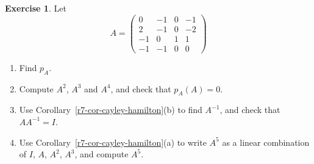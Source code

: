 \documentclass[12pt]{article}
\theoremstyle{definition}
\newtheorem{exercise}{Exercise}
\begin{document}
\begin{exercise}\label{r7-dr-cayley-hamilton}
Let
\[
A=\begin{pmatrix}0&-1&0&-1\\2&-1&0&-2\\-1&0&1&1\\-1&-1&0&0\end{pmatrix}
\]
\begin{enumerate}
\item Find \(p_A\).
\item Compute \(A^2\), \(A^3\) and \(A^4\), and check that \(p_A(A)=0\).
\item Use Corollary~\ref{r7-cor-cayley-hamilton}(b) to find \(A^{-1}\), and check that \(AA^{-1}=I\).
\item Use Corollary~\ref{r7-cor-cayley-hamilton}(a) to write \(A^5\) as a linear combination of \(I\), \(A\), \(A^2\),
\(A^3\), and compute \(A^5\).
\end{enumerate}
\end{exercise}
\end{document}
